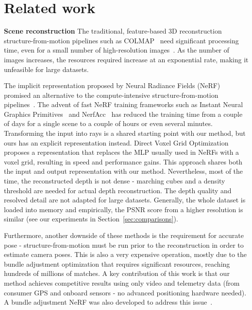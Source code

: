 \documentclass{article}
\begin{document}
\section{Related work}\label{rw}

\textbf{Scene reconstruction} The traditional, feature-based 3D reconstruction structure-from-motion pipelines such as COLMAP~\cite{schoenberger2016sfm} need significant processing time, even for a small number of high-resolution images~\cite{jiang2020efficient}. As the number of images increases, the resources required increase at an exponential rate\cite{triggs2000bundle}, making it unfeasible for large datasets. 

The implicit representation proposed by Neural Radiance Fields (NeRF)~\cite{mildenhall2021nerf} promised an alternative to the compute-intensive structure-from-motion pipelines~\cite{griwodz2021alicevision}. The advent of fast NeRF training frameworks such as Instant Neural Graphics Primitives~\cite{muller2022instant} and NerfAcc~\cite{li2022nerfacc} has reduced the training time from a couple of days for a single scene to a couple of hours or even several minutes. Transforming the input into rays is a shared starting point with our method, but ours has an explicit representation instead. Direct Voxel Grid Optimization~\cite{sun2022direct} proposes a representation that replaces the MLP usually used in NeRFs with a voxel grid, resulting in speed and performance gains. This approach shares both the input and output representation with our method. Nevertheless, most of the time, the reconstructed depth is not dense - marching cubes and a density threshold are needed for actual depth reconstruction. The depth quality and resolved detail are not adapted for large datasets. Generally, the whole dataset is loaded into memory and empirically, the PSNR score from a higher resolution is similar (see our experiments in Section~\ref{sec:comparisons}). 

Furthermore, another downside of these methods is the requirement for accurate pose - structure-from-motion must be run prior to the reconstruction in order to estimate camera poses. This is also a very expensive operation, mostly due to the bundle adjustment optimization that requires significant resources, reaching hundreds of millions of matches. A key contribution of this work is that our method achieves competitive results using only video and telemetry data (from consumer GPS and onboard sensors - no advanced positioning hardware needed). A bundle adjustment NeRF was also developed to address this issue~\cite{chen2022local}.
\end{document}
